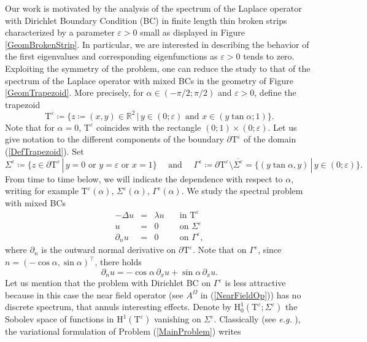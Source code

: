 \documentclass[11pt,a4paper]{article}
\newcommand{\eps}{\varepsilon}
\newcommand{\Om}{\Omega}
\newcommand{\mrm}[1]{\mathrm{#1}}
\newcommand{\R}{\mathbb{R}}
\newcommand{\mH}{\mrm{H}}
\begin{document}
\noindent Our work is motivated by the analysis of the spectrum of the Laplace operator with Dirichlet Boundary Condition (BC) in finite length thin broken strips characterized by a parameter $\eps>0$ small as displayed in Figure \ref{GeomBrokenStrip}. In particular, we are interested in describing the behavior of the first eigenvalues and corresponding eigenfunctions as $\eps>0$ tends to zero. Exploiting the symmetry of the problem, one can reduce the study to that of the spectrum of the Laplace operator with mixed BCs in the geometry of Figure \ref{GeomTrapezoid}. More precisely, for $\alpha\in(-\pi/2;\pi/2)$ and $\eps>0$, define the trapezoid
\begin{equation}\label{DefTrapezoid}
\mathrm{T}^\eps \coloneqq \{ z\coloneqq(x,y)\in \R^2\,|\,y\in(0;\eps)\mbox{ and }x\in (y\tan\alpha;1)\}.
\end{equation}
Note that for $\alpha=0$, $\mathrm{T}^\eps$ coincides with the rectangle $(0;1)\times(0;\eps)$. Let us give notation to the different components of the boundary $\partial\mathrm{T}^\eps$ of the domain (\ref{DefTrapezoid}). Set 
\[
\Sigma^\eps\coloneqq \{ z\in\partial\mathrm{T}^\eps\,|\,y = 0\mbox{ or }y=\eps\mbox{ or }x=1\}\quad \mbox{ and }\quad \Gamma^\eps \coloneqq \partial\mathrm{T}^\eps\setminus\overline{\Sigma^\eps}=\{ (y\tan\alpha,y)\,|\,y\in(0;\eps)\}.
\]
From time to time below, we will indicate the dependence with respect to $\alpha$, writing for example $\mathrm{T}^\eps(\alpha)$, $\Sigma^\eps(\alpha)$, $\Gamma^\eps(\alpha)$. We study the spectral problem with mixed BCs
\begin{equation}\label{MainProblem}
\begin{array}{|rcll}
- \Delta u &=& \lambda u & \quad\mbox{in }\mathrm{T}^\eps\\[3pt]
u &=& 0 & \quad\mbox{on }\Sigma^\eps \\[3pt]
\partial_n u  &=& 0 & \quad\mbox{on }\Gamma^\eps,
\end{array}
\end{equation}
where $\partial_n$ is the outward normal derivative on $\partial\mathrm{T}^\eps$. Note that on $\Gamma^\eps$, since $n=(-\cos\alpha,\sin\alpha)^\top$, there holds 
\[
\partial_n u=-\cos\alpha\,\partial_xu+\sin\alpha\,\partial_xu.
\]
Let us mention that the problem with Dirichlet BC on $\Gamma^\eps$ is less attractive because in this case the near field operator (see $A^\Om$ in (\ref{NearFieldOp})) has no discrete spectrum, that annuls interesting effects. Denote by $\mH_0^1(\mathrm{T}^\eps; \Sigma^\eps)$ the Sobolev space of functions in $\mH^1(\mathrm{T}^\eps)$ vanishing on $\Sigma^\eps$. Classically (see \textit{e.g.} \cite{Lad,LiMa68}), the variational formulation  of Problem (\ref{MainProblem}) writes
\end{document}
